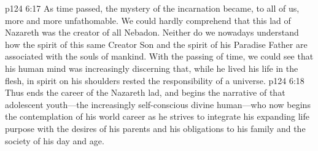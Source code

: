 \vs p124 6:17 As time passed, the mystery of the incarnation became, to all of us, more and more unfathomable. We could hardly comprehend that this lad of Nazareth was the creator of all Nebadon. Neither do we nowadays understand how the spirit of this same Creator Son and the spirit of his Paradise Father are associated with the souls of mankind. With the passing of time, we could see that his human mind was increasingly discerning that, while he lived his life in the flesh, in spirit on his shoulders rested the responsibility of a universe.
\pc \vs p124 6:18 Thus ends the career of the Nazareth lad, and begins the narrative of that adolescent youth---the increasingly self\hyp{}conscious divine human---who now begins the contemplation of his world career as he strives to integrate his expanding life purpose with the desires of his parents and his obligations to his family and the society of his day and age.\plusone
